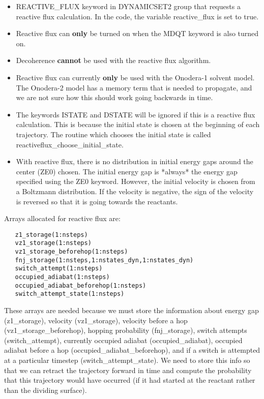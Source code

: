 \documentclass[aps,amsfonts,amsmath,amssymb,onecolumn,tightenlines,notitlepage]{revtex4-2}
\begin{document}
\begin{itemize}
\item {\ttfamily REACTIVE\_FLUX} keyword in {\ttfamily DYNAMICSET2} group that requests a reactive flux calculation. In the code, the variable {\ttfamily reactive\_flux} is set to true.

\item Reactive flux can {\bf only} be turned on when the {\ttfamily MDQT} keyword is also turned on.

\item Decoherence {\bf cannot} be used with the reactive flux algorithm.

\item Reactive flux can currently {\bf only} be used with the Onodera-1 solvent model. The Onodera-2 model has a memory term that is needed to propagate, and we are not sure how this should work going backwards in time. 

\item The keywords {\ttfamily ISTATE} and {\ttfamily DSTATE} will be ignored if this is a reactive flux calculation. This is because the initial state is chosen at the beginning of each trajectory. The routine which chooses the initial state is called {\ttfamily reactiveflux\_choose\_initial\_state}.

\item With reactive flux, there is no distribution in initial energy gaps around the center (ZE0) chosen.  The initial energy gap is *always* the energy gap specified using the ZE0 keyword.  However, the initial velocity is chosen from a Boltzmann distribution.  If the velocity is negative, the sign of the velocity is reversed so that it is going towards the reactants.

\end{itemize}

Arrays allocated for reactive flux are:
\begin{verbatim}
   z1_storage(1:nsteps)
   vz1_storage(1:nsteps)
   vz1_storage_beforehop(1:nsteps)
   fnj_storage(1:nsteps,1:nstates_dyn,1:nstates_dyn)
   switch_attempt(1:nsteps)
   occupied_adiabat(1:nsteps)
   occupied_adiabat_beforehop(1:nsteps)
   switch_attempt_state(1:nsteps)
\end{verbatim}

\noindent These arrays are needed because we must store the information about energy gap ({\ttfamily z1\_storage}), velocity ({\ttfamily vz1\_storage}), velocity before a hop ({\ttfamily vz1\_storage\_beforehop}), hopping probability ({\ttfamily fnj\_storage}), switch attempts ({\ttfamily switch\_attempt}), currently occupied adiabat ({\ttfamily occupied\_adiabat}), occupied adiabat before
a hop ({\ttfamily occupied\_adiabat\_beforehop}), and if a switch is attempted at a particular timestep
({\ttfamily switch\_attempt\_state}).  We need to store this info so that we can retract the trajectory forward in time and compute the probability that this trajectory would have occurred (if it had started at the reactant rather than the dividing surface).
\end{document}
